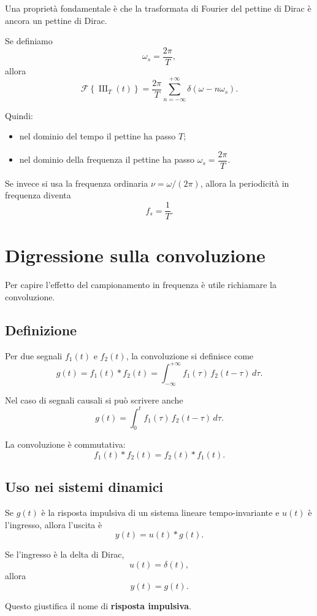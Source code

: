 Una proprietà fondamentale è che la trasformata di Fourier del pettine di Dirac
è ancora un pettine di Dirac.

Se definiamo
\[
\omega_s=\frac{2\pi}{T},
\]
allora
\[
\mathcal{F}\left\{\operatorname{III}_T(t)\right\}
=
\frac{2\pi}{T}\sum_{n=-\infty}^{+\infty}\delta(\omega-n\omega_s).
\]

Quindi:
\begin{itemize}
    \item nel dominio del tempo il pettine ha passo \(T\);
    \item nel dominio della frequenza il pettine ha passo \(\omega_s=\dfrac{2\pi}{T}\).
\end{itemize}

Se invece si usa la frequenza ordinaria \(\nu=\omega/(2\pi)\), allora la periodicità in frequenza diventa
\[
f_s=\frac{1}{T}.
\]

\section{Digressione sulla convoluzione}

Per capire l'effetto del campionamento in frequenza è utile richiamare la convoluzione.

\subsection{Definizione}

Per due segnali \(f_1(t)\) e \(f_2(t)\), la convoluzione si definisce come
\[
g(t)=f_1(t)\ast f_2(t)=\int_{-\infty}^{+\infty} f_1(\tau)\,f_2(t-\tau)\,d\tau.
\]

Nel caso di segnali causali si può scrivere anche
\[
g(t)=\int_{0}^{t} f_1(\tau)\,f_2(t-\tau)\,d\tau.
\]

La convoluzione è commutativa:
\[
f_1(t)\ast f_2(t)=f_2(t)\ast f_1(t).
\]

\subsection{Uso nei sistemi dinamici}

Se \(g(t)\) è la risposta impulsiva di un sistema lineare tempo-invariante e \(u(t)\)
è l'ingresso, allora l'uscita è
\[
y(t)=u(t)\ast g(t).
\]

Se l'ingresso è la delta di Dirac,
\[
u(t)=\delta(t),
\]
allora
\[
y(t)=g(t).
\]

Questo giustifica il nome di \textbf{risposta impulsiva}.

